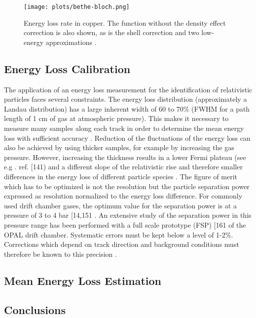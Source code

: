 \begin{figure}[h]
    \centering
    \texttt{[image: plots/bethe-bloch.png]}
    \caption{\label{fig.3.1}Energy loss rate in copper. The function without the density effect correction is also shown, as is the shell correction and two low-energy approximations .}
\end{figure}

\subsection{Energy Loss Calibration}
The application of an energy loss measurement for the identification of relativistic particles faces several constraints. The energy loss distribution (approximately a Landau distribution) has a large inherent width of 60 to 70$\%$ (FWHM for a path length of 1 cm of gas at atmospheric pressure). This makes it necessary to measure many samples along each track in
order to determine the mean energy loss with sufficient accuracy . Reduction of the fluctuations of the energy loss can also be achieved by using thicker samples, for example by increasing the gas pressure. However, increasing the thickness results in a lower Fermi plateau (see e.g . ref. [141) and a different slope of the relativistic rise and therefore smaller differences in the energy loss of different particle species . The figure of merit which has to be optimized is not the resolution but the particle separation power expressed as resolution normalized to the energy loss difference. For commonly used drift chamber gases, the optimum value for the separation power is at a pressure of 3 to 4 bar [14,151 . An extensive study of the separation power in this
pressure range has been performed with a full scale prototype (FSP) [161 of the OPAL drift chamber. Systematic errors must be kept below a level of 1-2$\%$. Corrections which depend on track direction and background conditions must therefore be known to this precision .
\subsection{Mean Energy Loss Estimation}

\subsection{Conclusions}
